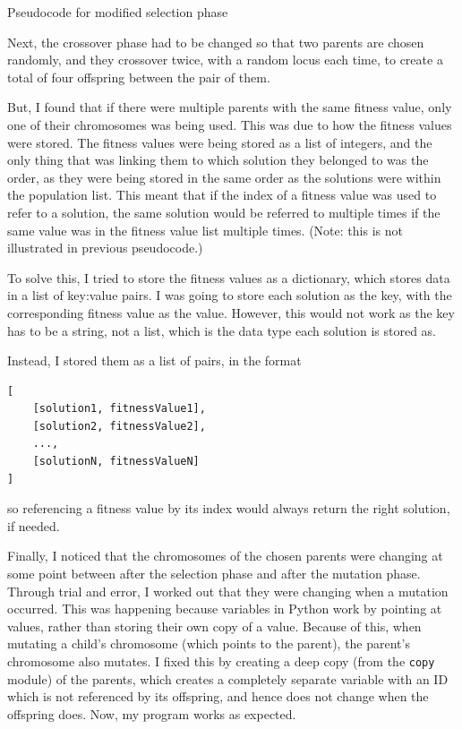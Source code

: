 \begin{listing}[!ht]
	\inputminted[linenos, fontsize=\footnotesize]{text}{code/selection-new.txt}
	\caption{Pseudocode for modified selection phase}
	\label{listing:selection-new}
\end{listing}

Next, the crossover phase had to be changed so that two parents are chosen
randomly, and they crossover twice, with a random locus each time, to create a 
total of four offspring between the pair of them.

But, I found that if there were multiple parents with the same fitness value,
only one of their chromosomes was being used.
This was due to how the fitness values were stored.
The fitness values were being stored as a list of integers, and the only thing 
that was linking them to which solution they belonged to was the order, as they
were being stored in the same order as the solutions were within the population
list.
This meant that if the index of a fitness value was used to refer to a solution,
the same solution would be referred to multiple times if the same value was in
the fitness value list multiple times. (Note: this is not illustrated in 
previous pseudocode.)

To solve this, I tried to store the fitness values as a dictionary, which stores
data in a list of key:value pairs.
I was going to store each solution as the key, with the corresponding fitness
value as the value.
However, this would not work as the key has to be a string, not a list, which is
the data type each solution is stored as.

Instead, I stored them as a list of pairs, in the format
\begin{Verbatim}[tabsize=4]
[
	[solution1, fitnessValue1],
	[solution2, fitnessValue2],
	...,
	[solutionN, fitnessValueN]
]
\end{Verbatim}
so referencing a fitness value by its index would always return the right 
solution, if needed.

Finally, I noticed that the chromosomes of the chosen parents were changing at
some point between after the selection phase and after the mutation phase.
Through trial and error, I worked out that they were changing when a mutation
occurred. 
This was happening because variables in Python work by pointing at values, 
rather than storing their own copy of a value.
Because of this, when mutating a child's chromosome (which points to the 
parent), the parent's chromosome also mutates.
I fixed this by creating a deep copy (from the \verb|copy| module) of the 
parents, which creates a completely separate variable with an ID which is not
referenced by its offspring, and hence does not change when the offspring does.
Now, my program works as expected.

